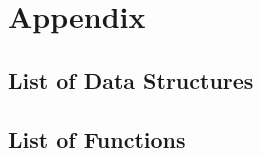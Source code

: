 \documentclass[11pt]{memoir}
\begin{document}
\chapter*{Appendix}\label{ch:append}

\section*{List of Data Structures}

\section*{List of Functions}


\newpage
\begin{footnotesize}


\end{footnotesize}
\end{document}
